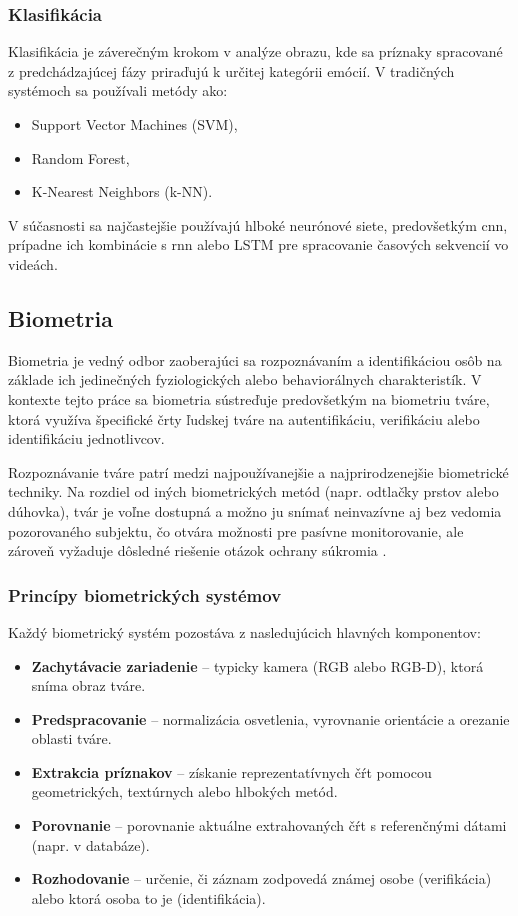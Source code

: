 \subsubsection{Klasifikácia}
Klasifikácia je záverečným krokom v analýze obrazu, kde sa príznaky spracované z predchádzajúcej fázy priraďujú k určitej kategórii emócií. V tradičných systémoch sa používali metódy ako:
\begin{itemize}
    \item Support Vector Machines (SVM),
    \item Random Forest,
    \item K-Nearest Neighbors (k-NN).
\end{itemize}

V súčasnosti sa najčastejšie používajú hlboké neurónové siete, predovšetkým \gls{cnn}, prípadne ich kombinácie s \gls{rnn} alebo LSTM pre spracovanie časových sekvencií vo videách.

\subsection{Biometria}

Biometria je vedný odbor zaoberajúci sa rozpoznávaním a identifikáciou osôb na základe ich jedinečných fyziologických alebo behaviorálnych charakteristík. V kontexte tejto práce sa biometria sústreďuje predovšetkým na biometriu tváre, ktorá využíva špecifické črty ľudskej tváre na autentifikáciu, verifikáciu alebo identifikáciu jednotlivcov.

Rozpoznávanie tváre patrí medzi najpoužívanejšie a najprirodzenejšie biometrické techniky. Na rozdiel od iných biometrických metód (napr. odtlačky prstov alebo dúhovka), tvár je voľne dostupná a možno ju snímať neinvazívne aj bez vedomia pozorovaného subjektu, čo otvára možnosti pre pasívne monitorovanie, ale zároveň vyžaduje dôsledné riešenie otázok ochrany súkromia\cite{inProceedings01} \cite{article03}.

\subsubsection{Princípy biometrických systémov}

Každý biometrický systém pozostáva z nasledujúcich hlavných komponentov:
\begin{itemize}
    \item \textbf{Zachytávacie zariadenie} -- typicky kamera (RGB alebo RGB-D), ktorá sníma obraz tváre.
    \item \textbf{Predspracovanie} -- normalizácia osvetlenia, vyrovnanie orientácie a orezanie oblasti tváre.
    \item \textbf{Extrakcia príznakov} -- získanie reprezentatívnych čŕt pomocou geometrických, textúrnych alebo hlbokých metód.
    \item \textbf{Porovnanie} -- porovnanie aktuálne extrahovaných čŕt s referenčnými dátami (napr. v databáze).
    \item \textbf{Rozhodovanie} -- určenie, či záznam zodpovedá známej osobe (verifikácia) alebo ktorá osoba to je (identifikácia).
\end{itemize}

